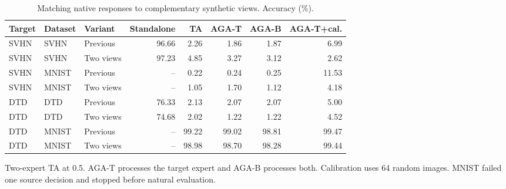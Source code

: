 \begin{table}[t]
\centering\small
\setlength{\tabcolsep}{4pt}
\caption{Matching native responses to complementary synthetic views. Accuracy (\%).}
\label{tab:defense2_native_views}
\begin{tabular}{@{}lllrrrrr@{}}
\toprule
Target & Dataset & Variant & Standalone & TA & AGA-T & AGA-B & AGA-T+cal. \\
\midrule
SVHN & SVHN & Previous & 96.66 & 2.26 & 1.86 & 1.87 & 6.99 \\
SVHN & SVHN & Two views & 97.23 & 4.85 & 3.27 & 3.12 & 2.62 \\
SVHN & MNIST & Previous & -- & 0.22 & 0.24 & 0.25 & 11.53 \\
SVHN & MNIST & Two views & -- & 1.05 & 1.70 & 1.12 & 4.18 \\
\midrule
DTD & DTD & Previous & 76.33 & 2.13 & 2.07 & 2.07 & 5.00 \\
DTD & DTD & Two views & 74.68 & 2.02 & 1.22 & 1.22 & 4.52 \\
DTD & MNIST & Previous & -- & 99.22 & 99.02 & 98.81 & 99.47 \\
DTD & MNIST & Two views & -- & 98.98 & 98.70 & 98.28 & 99.44 \\
\bottomrule
\end{tabular}
\par\smallskip
\begin{minipage}{\textwidth}\footnotesize Two-expert TA at 0.5. AGA-T processes the target expert and AGA-B processes both. Calibration uses 64 random images. MNIST failed one source decision and stopped before natural evaluation.\end{minipage}
\end{table}
